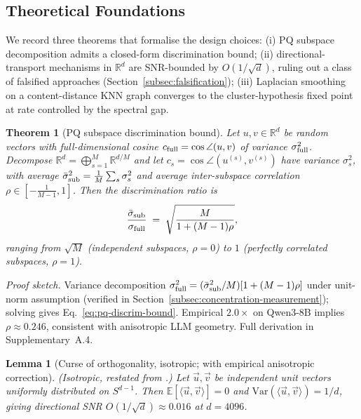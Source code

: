 \documentclass[review,1p]{elsarticle}
\newtheorem{lemma}{Lemma}
\newtheorem{theorem}{Theorem}
\newcommand{\R}{\mathbb{R}}
\begin{document}
\subsection{Theoretical Foundations}
\label{subsec:theory}

We record three theorems that formalise the design choices: (i) PQ subspace decomposition admits a closed-form discrimination bound; (ii) directional-transport mechanisms in $\R^d$ are SNR-bounded by $O(1/\sqrt{d})$, ruling out a class of falsified approaches (Section~\ref{subsec:falsification}); (iii) Laplacian smoothing on a content-distance KNN graph converges to the cluster-hypothesis fixed point at rate controlled by the spectral gap.

\begin{theorem}[PQ subspace discrimination bound]
\label{thm:pq-discrim}
Let $u, v \in \R^d$ be random vectors with full-dimensional cosine $c_{\rm full} = \cos\angle(u,v)$ of variance $\sigma_{\rm full}^2$. Decompose $\R^d = \bigoplus_{s=1}^M \R^{d/M}$ and let $c_s = \cos\angle(u^{(s)}, v^{(s)})$ have variance $\sigma_s^2$, with average $\bar\sigma_{\rm sub}^2 = \frac{1}{M}\sum_s \sigma_s^2$ and average inter-subspace correlation $\rho \in [-\frac{1}{M-1}, 1]$. Then the discrimination ratio is
\begin{equation}
\label{eq:pq-discrim-bound}
\frac{\bar\sigma_{\rm sub}}{\sigma_{\rm full}} \;=\; \sqrt{\frac{M}{1 + (M-1)\rho}},
\end{equation}
ranging from $\sqrt{M}$ (independent subspaces, $\rho=0$) to $1$ (perfectly correlated subspaces, $\rho=1$).
\end{theorem}

\noindent\emph{Proof sketch.} Variance decomposition $\sigma_{\rm full}^2 = (\bar\sigma_{\rm sub}^2/M)[1+(M-1)\rho]$ under unit-norm assumption (verified in Section~\ref{subsec:concentration-measurement}); solving gives Eq.~\eqref{eq:pq-discrim-bound}. Empirical $2.0\times$ on Qwen3-8B implies $\rho \approx 0.246$, consistent with anisotropic LLM geometry. Full derivation in Supplementary~A.4.

\begin{lemma}[Curse of orthogonality, isotropic; with empirical anisotropic correction]
\label{thm:curse-orthogonality}
\textup{(Isotropic, restated from \citep{vershynin2018hdp}.)} Let $\vec{u}, \vec{v}$ be independent unit vectors uniformly distributed on $S^{d-1}$. Then $\mathbb{E}[\langle\vec{u},\vec{v}\rangle] = 0$ and $\mathrm{Var}(\langle\vec{u},\vec{v}\rangle) = 1/d$, giving directional SNR $O(1/\sqrt{d}) \approx 0.016$ at $d=4096$.
\end{lemma}
\end{document}
